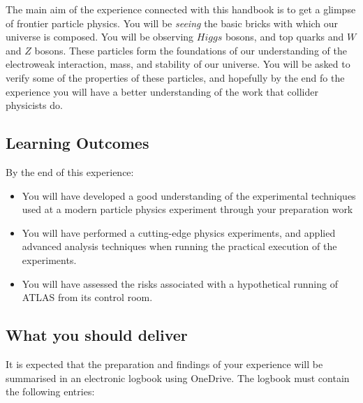 
The main aim of the experience connected with this handbook is to get a glimpse of frontier particle physics. You will be \textit{seeing} the basic bricks with which our universe is composed. You will be observing $Higgs$ bosons, and top quarks and $W$ and $Z$ bosons. These particles form the foundations of our understanding of the electroweak interaction, mass, and stability of our universe. You will be asked to verify some of the properties of these particles, and hopefully by the end fo the experience you will have a better understanding of the work that collider physicists do. 

\subsection{Learning Outcomes}

By the end of this experience: 

\begin{itemize}
\item You will have developed a good understanding of the experimental techniques used at a modern particle physics experiment through your preparation work
\item You will have performed a cutting-edge physics experiments, and applied advanced analysis techniques when running the practical execution of the experiments.
\item You will have assessed the risks associated with a hypothetical running of ATLAS from its control room. 
\end{itemize}

\subsection{What you should deliver}

It is expected that the preparation and findings of your experience will be summarised in an electronic logbook using OneDrive. The logbook must contain the following entries: 

